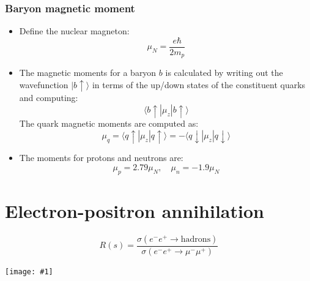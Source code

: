 \documentclass[11pt]{article}
\newcommand{\ra}{\rangle}
\newcommand{\la}{\langle}
\newcommand{\el}{\ensuremath{e^{-}}}
\newcommand{\pos}{\ensuremath{e^{+}}}
\newcommand{\embedimgw}[2]{\begin{center}\texttt{[image: \#1]}\end{center}}
\begin{document}
\subsubsection{Baryon magnetic moment}
\begin{itemize}
  \item Define the nuclear magneton:
  \begin{equation}
    \mu_N = \frac{e\hbar}{2m_p}
  \end{equation}
  \item The magnetic moments for a baryon $b$ is calculated by writing out the wavefunction $|b\uparrow\ra$ in terms of the up/down states of the constituent quarks and computing:
  \begin{equation}
    \la b\uparrow | \mu_z | b\uparrow\ra
  \end{equation}
  The quark magnetic moments are computed as:
  \begin{equation}
    \mu_q = \la q\uparrow | \mu_z | q\uparrow\ra = - \la q\downarrow | \mu_z | q\downarrow\ra
  \end{equation}
  \item The moments for protons and neutrons are:
  \begin{equation}
    \mu_p = 2.79\mu_N,\quad \mu_n = -1.9\mu_N
  \end{equation}
\end{itemize}

\section{Electron-positron annihilation}

\begin{equation}
  R(s) = \frac{\sigma(\el\pos\rightarrow \text{hadrons})}{\sigma(\el\pos\rightarrow \mu^-\mu^+)}
\end{equation}


\embedimgw{figs/ee_xsec.png}{.8}
\end{document}
